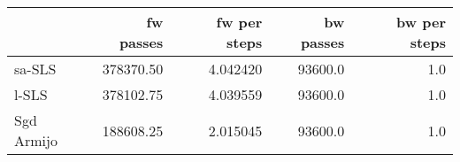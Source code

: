 \begin{tabular}{lrrrr}
\toprule
{} &  fw passes &  fw per steps &  bw passes &  bw per steps \\
\midrule
sa-SLS     &  378370.50 &      4.042420 &    93600.0 &           1.0 \\
l-SLS      &  378102.75 &      4.039559 &    93600.0 &           1.0 \\
Sgd Armijo &  188608.25 &      2.015045 &    93600.0 &           1.0 \\
\bottomrule
\end{tabular}
